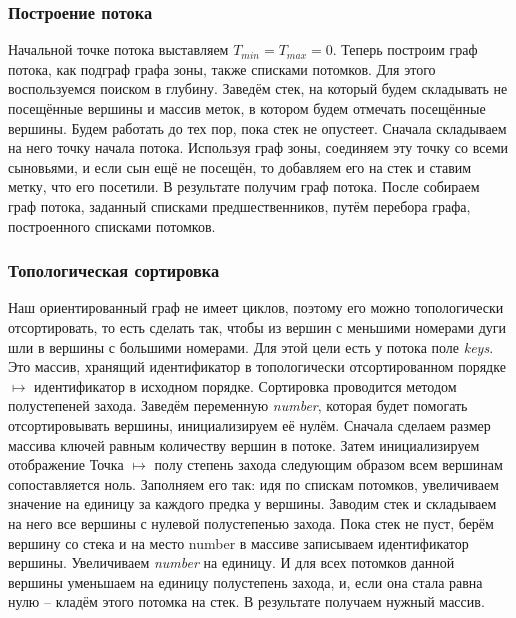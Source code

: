 \documentclass[12pt, a4 paper]{article}
\theoremstyle{plain}
\begin{document}


\subsubsection*{Построение потока}

Начальной точке потока выставляем $T_{min} = T_{max} = 0$. Теперь построим граф потока, как подграф графа зоны, также списками потомков. Для этого воспользуемся поиском в глубину. Заведём стек, на который будем складывать не посещённые вершины и массив меток, в котором будем отмечать посещённые вершины. Будем работать до тех пор, пока стек не опустеет. Сначала складываем на него точку начала потока. Используя граф зоны, соединяем эту точку со всеми сыновьями, и если сын ещё не посещён, то добавляем его на стек и ставим метку, что его посетили. В результате получим граф потока. После собираем граф потока, заданный списками предшественников, путём перебора графа, построенного списками потомков.





\subsubsection*{Топологическая сортировка}


Наш ориентированный граф не имеет циклов, поэтому его можно топологически отсортировать, то есть сделать так, чтобы из вершин с меньшими номерами дуги шли в вершины с большими номерами. Для этой цели есть у потока поле \textit{keys}. Это массив, хранящий идентификатор в топологически отсортированном порядке $\mapsto$ идентификатор в исходном порядке. Сортировка проводится методом полустепеней захода. Заведём переменную \textit{number}, которая будет помогать отсортировывать вершины, инициализируем её нулём. Сначала сделаем размер массива ключей равным количеству вершин в потоке. Затем инициализируем отображение Точка $\mapsto$ полу степень захода следующим образом всем вершинам сопоставляется ноль. Заполняем его так: идя по спискам потомков, увеличиваем значение на единицу за каждого предка у вершины. Заводим стек и складываем на него все вершины с нулевой полустепенью захода. Пока стек не пуст, берём вершину со стека и на место number в массиве записываем идентификатор вершины. Увеличиваем \textit{number} на единицу. И для всех потомков данной вершины уменьшаем на единицу полустепень захода, и, если она стала равна нулю – кладём этого потомка на стек. В результате получаем нужный массив.
\end{document}
